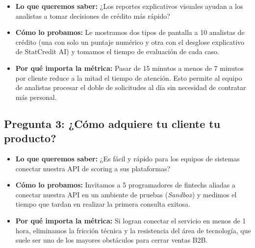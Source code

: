 \documentclass[11pt,a4paper]{article}
\begin{document}
\begin{tcolorbox}[colback=lightgray,colframe=secondary,title=\textbf{Experimento 2.2: Prueba de usabilidad de reportes con analistas de riesgo}]
\begin{itemize}[leftmargin=*]
    \item \textbf{Lo que queremos saber:} ¿Los reportes explicativos visuales ayudan a los analistas a tomar decisiones de crédito más rápido?
    \item \textbf{Cómo lo probamos:} Le mostramos dos tipos de pantalla a 10 analistas de crédito (una con solo un puntaje numérico y otra con el desglose explicativo de StatCredit AI) y tomamos el tiempo de evaluación de cada caso.
    \item \textbf{Por qué importa la métrica:} Pasar de 15 minutos a menos de 7 minutos por cliente reduce a la mitad el tiempo de atención. Esto permite al equipo de analistas procesar el doble de solicitudes al día sin necesidad de contratar más personal.
\end{itemize}
\end{tcolorbox}

\subsection{Pregunta 3: ¿Cómo adquiere tu cliente tu producto?}

\begin{tcolorbox}[colback=lightgray,colframe=secondary,title=\textbf{Experimento 3.1: Prueba de facilidad de integración de la API}]
\begin{itemize}[leftmargin=*]
    \item \textbf{Lo que queremos saber:} ¿Es fácil y rápido para los equipos de sistemas conectar nuestra API de scoring a sus plataformas?
    \item \textbf{Cómo lo probamos:} Invitamos a 5 programadores de fintechs aliadas a conectar nuestra API en un ambiente de pruebas (\textit{Sandbox}) y medimos el tiempo que tardan en realizar la primera consulta exitosa.
    \item \textbf{Por qué importa la métrica:} Si logran conectar el servicio en menos de 1 hora, eliminamos la fricción técnica y la resistencia del área de tecnología, que suele ser uno de los mayores obstáculos para cerrar ventas B2B.
\end{itemize}
\end{tcolorbox}
\end{document}
